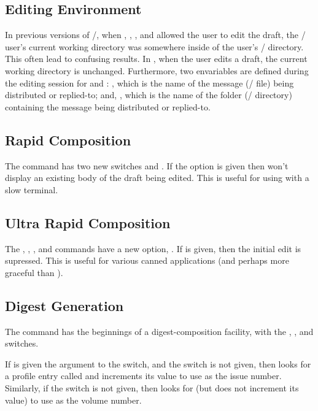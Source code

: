 \subsection{Editing Environment}
In previous versions of \MH/,
when , , , and  allowed the user to
edit the draft,
the \MH/ user's current working directory was somewhere inside of the user's
\MH/ directory.
This often lead to confusing results.
In ,
when the user edits a draft,
the current working directory is unchanged.
Furthermore, two envariables are defined during the editing session for
 and :
,
which is the name of the message (\unix/ file) being distributed or replied-to;
and,
,
which is the name of the folder (\unix/ directory) containing the message
being distributed or replied-to.

\subsection{Rapid Composition}
The  command has two new switches  and
.
If the  option is given then  won't display an
existing body of the draft being edited.
This is useful for using  with a slow terminal.

\subsection{Ultra Rapid Composition}
The , , , and  commands have a new
option, .
If  is given,
then the initial edit is supressed.
This is useful for various canned applications
(and perhaps more graceful than ).

\subsection{Digest Generation}
The  command has the beginnings of a digest-composition facility,
with the , ,
and  switches.

If  is given the argument  to the  switch,
and the  switch is not given,
then  looks for a profile entry called
 and increments its value to use as the issue
number.
Similarly,
if the  switch is not given,
then  looks for 
(but does not increment its value) to use as the volume number.

